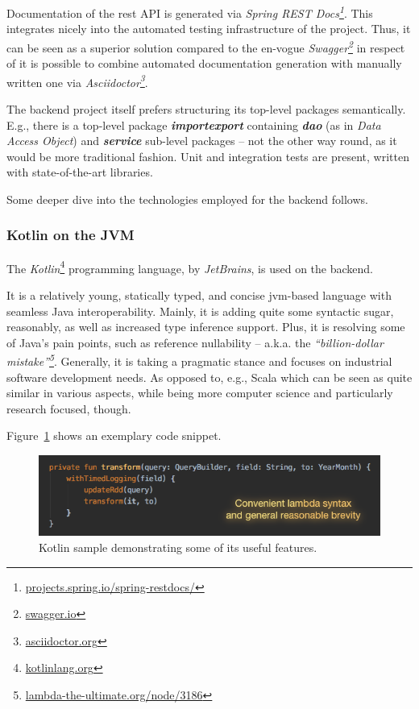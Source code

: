 Documentation of the \gls{rest} \textsc{API} is generated via \emph{Spring REST Docs\footnote{\textcolor{blue}{\href{https://projects.spring.io/spring-restdocs/}{projects.spring.io/spring-restdocs/}}}}.
This integrates nicely into the automated testing infrastructure of the project.
Thus, it can be seen as a superior solution compared to the en-vogue \emph{Swagger\footnote{\textcolor{blue}{\href{http://swagger.io/}{swagger.io}}}} in respect of it is possible to combine automated documentation generation with manually written one via
\emph{Asciidoctor\footnote{\textcolor{blue}{\href{http://asciidoctor.org/}{asciidoctor.org}}}}.

The backend project itself prefers structuring its top-level packages semantically.
E.g., there is a top-level package \emph{\textbf{importexport}} containing \emph{\textbf{dao}} (as in \emph{Data Access Object}) and \emph{\textbf{service}} sub-level packages -- not the other way round, as it would be more traditional fashion.
Unit and integration tests are present, written with state-of-the-art libraries.

Some deeper dive into the technologies employed for the backend follows.


\subsubsection{Kotlin on the JVM}

The \emph{Kotlin}\footnote{\textcolor{blue}{\href{https://kotlinlang.org/}{kotlinlang.org}}} programming language, by \emph{JetBrains}, is used on the backend.

It is a relatively young, statically typed, and concise \gls{jvm}-based language with seamless Java interoperability.
Mainly, it is adding quite some syntactic sugar, reasonably, as well as increased type inference support.
Plus, it is resolving some of Java's pain points, such as reference nullability -- a.k.a. the \emph{``billion-dollar mistake''\footnote{\textcolor{blue}{\href{http://lambda-the-ultimate.org/node/3186}{lambda-the-ultimate.org/node/3186}}}}.
Generally, it is taking a pragmatic stance and focuses on industrial software development needs.
As opposed to, e.g., Scala which can be seen as quite similar in various aspects, while being more computer science and particularly research focused, though.

Figure~\ref{fig:kotlin-sample} shows an exemplary code snippet.

\begin{figure}[h]
  \centering
  \includegraphics[width=1.0\textwidth]{figures/architecture/kotlin-sample}
  \caption{Kotlin sample demonstrating some of its useful features.}
  \label{fig:kotlin-sample}
\end{figure}

